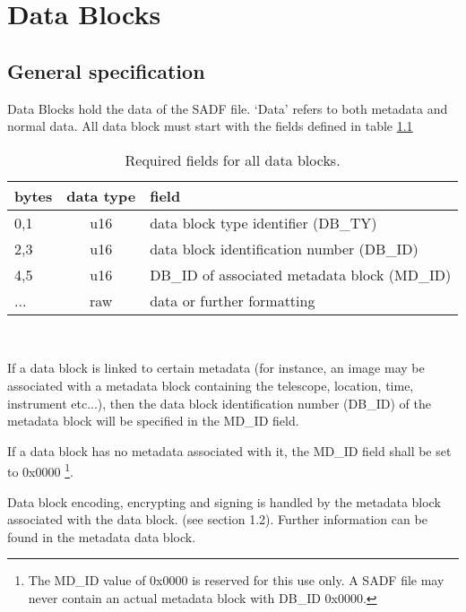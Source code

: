 \documentclass[pagesize=a4]{tufte-book}
\begin{document}
\chapter{Data Blocks}
\section{General specification}
Data Blocks hold the data of the SADF file.  `Data' refers to both metadata and normal data. All data block must start with the fields defined in table \ref{tab:db_required_fields}

\begin{table}[ht]
	\centering
	\selectfont
	\begin{tabular}{lcl}
		\toprule
		bytes & data type & field\\
		\midrule
		0,1 & u16 & data block type identifier (DB\_TY)\\
		2,3 & u16 & data block identification number (DB\_ID)\\
		4,5 & u16 & DB\_ID of associated metadata block (MD\_ID)\\
		... & raw & data or further formatting\\
		\bottomrule
	\end{tabular}
	~\label{tab:db_required_fields}
	\caption{Required fields for all data blocks.}	
\end{table}

If a data block is linked to certain metadata (for instance, an image may be 
associated with a metadata block containing the telescope, location, time, instrument etc...), then the data block identification number (DB\_ID) of the metadata block will be specified in the MD\_ID field.

If a data block has no metadata associated with it, the MD\_ID field shall be set to 0x0000 \footnote{The MD\_ID value of 0x0000 is reserved for this use only. A SADF file may never contain an actual metadata block with DB\_ID 0x0000.}.

Data block encoding, encrypting and signing is handled by the metadata block
associated with the data block. (see section 1.2). Further information can be
found in the metadata data block.
\end{document}
